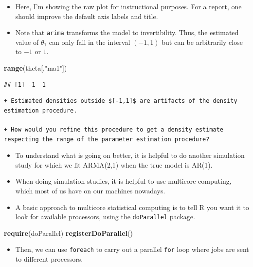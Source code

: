 \documentclass[]{article}
\newenvironment{Shaded}{\begin{snugshade}}{\end{snugshade}}
\newcommand{\KeywordTok}[1]{\textcolor[rgb]{0.13,0.29,0.53}{\textbf{#1}}}
\newcommand{\StringTok}[1]{\textcolor[rgb]{0.31,0.60,0.02}{#1}}
\newcommand{\NormalTok}[1]{#1}
\providecommand{\tightlist}{%
  \setlength{\itemsep}{0pt}\setlength{\parskip}{0pt}}
\begin{document}
\begin{itemize}
\item
  Here, I'm showing the raw plot for instructional purposes. For a
  report, one should improve the default axis labels and title.
\item
  Note that \texttt{arima} transforms the model to invertibility. Thus,
  the estimated value of \(\theta_1\) can only fall in the interval
  \((-1,1)\) but can be arbitrarily close to \(-1\) or \(1\).
\end{itemize}

\begin{Shaded}
\begin{Highlighting}[]
\KeywordTok{range}\NormalTok{(theta[,}\StringTok{"ma1"}\NormalTok{])}
\end{Highlighting}
\end{Shaded}

\begin{verbatim}
## [1] -1  1
\end{verbatim}

\begin{verbatim}
+ Estimated densities outside $[-1,1]$ are artifacts of the density estimation procedure. 

+ How would you refine this procedure to get a density estimate respecting the range of the parameter estimation procedure?
\end{verbatim}

\begin{itemize}
\item
  To understand what is going on better, it is helpful to do another
  simulation study for which we fit ARMA(2,1) when the true model is
  AR(1).
\item
  When doing simulation studies, it is helpful to use multicore
  computing, which most of us have on our machines nowadays.
\item
  A basic approach to multicore statistical computing is to tell R you
  want it to look for available processors, using the
  \texttt{doParallel} package.
\end{itemize}

\begin{Shaded}
\begin{Highlighting}[]
\KeywordTok{require}\NormalTok{(doParallel)}
\KeywordTok{registerDoParallel}\NormalTok{()}
\end{Highlighting}
\end{Shaded}

\begin{itemize}
\tightlist
\item
  Then, we can use \texttt{foreach} to carry out a parallel \texttt{for}
  loop where jobs are sent to different processors.
\end{itemize}
\end{document}
